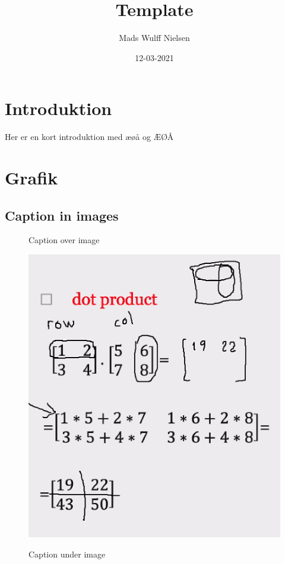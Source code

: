 \documentclass{article}
\title{Template}
\date{12-03-2021}
\author{Mads Wulff Nielsen}
\begin{document}
    \maketitle
    \thispagestyle{empty}
\newpage
    \tableofcontents
    \thispagestyle{empty}
\newpage
    \section{Introduktion}
    Her er en kort introduktion med æøå og ÆØÅ
    \section{Grafik}
    \subsection{Caption in images}
    \begin{figure}[htb]
        \begin{center}
            \caption{Caption over image}\label{fig:1}
            \includegraphics[scale=.5]{fig/1.png}
            \caption{Caption under image}
        \end{center}
    \end{figure}
\newpage
\end{document}
